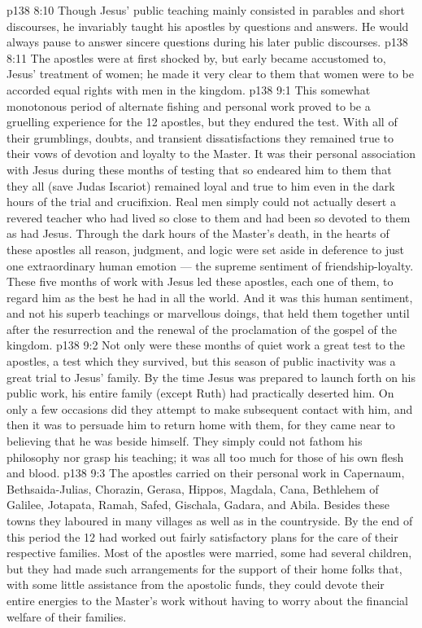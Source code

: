 \vs p138 8:10 \pc Though Jesus’ public teaching mainly consisted in parables and short discourses, he invariably taught his apostles by questions and answers. He would always pause to answer sincere questions during his later public discourses.
\vs p138 8:11 The apostles were at first shocked by, but early became accustomed to, Jesus’ treatment of women; he made it very clear to them that women were to be accorded equal rights with men in the kingdom.
\vs p138 9:1 This somewhat monotonous period of alternate fishing and personal work proved to be a gruelling experience for the 12 apostles, but they endured the test. With all of their grumblings, doubts, and transient dissatisfactions they remained true to their vows of devotion and loyalty to the Master. It was their personal association with Jesus during these months of testing that so endeared him to them that they all (save Judas Iscariot) remained loyal and true to him even in the dark hours of the trial and crucifixion. Real men simply could not actually desert a revered teacher who had lived so close to them and had been so devoted to them as had Jesus. Through the dark hours of the Master’s death, in the hearts of these apostles all reason, judgment, and logic were set aside in deference to just one extraordinary human emotion --- the supreme sentiment of friendship\hyp{}loyalty. These five months of work with Jesus led these apostles, each one of them, to regard him as the best  he had in all the world. And it was this human sentiment, and not his superb teachings or marvellous doings, that held them together until after the resurrection and the renewal of the proclamation of the gospel of the kingdom.
\vs p138 9:2 Not only were these months of quiet work a great test to the apostles, a test which they survived, but this season of public inactivity was a great trial to Jesus’ family. By the time Jesus was prepared to launch forth on his public work, his entire family (except Ruth) had practically deserted him. On only a few occasions did they attempt to make subsequent contact with him, and then it was to persuade him to return home with them, for they came near to believing that he was beside himself. They simply could not fathom his philosophy nor grasp his teaching; it was all too much for those of his own flesh and blood.
\vs p138 9:3 \pc The apostles carried on their personal work in Capernaum, Bethsaida\hyp{}Julias, Chorazin, Gerasa, Hippos, Magdala, Cana, Bethlehem of Galilee, Jotapata, Ramah, Safed, Gischala, Gadara, and Abila. Besides these towns they laboured in many villages as well as in the countryside. By the end of this period the 12 had worked out fairly satisfactory plans for the care of their respective families. Most of the apostles were married, some had several children, but they had made such arrangements for the support of their home folks that, with some little assistance from the apostolic funds, they could devote their entire energies to the Master’s work without having to worry about the financial welfare of their families.
